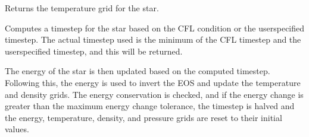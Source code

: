 \documentclass[letterpaper,10pt,english]{sphinxmanual}
\begin{document}
\begin{fulllineitems}
\begin{fulllineitems}
\end{fulllineitems}


\begin{fulllineitems}
\label{\detokenize{CoolDwarf.star:CoolDwarf.star.sphere.VoxelSphere.temperature}}
\pysigstartsignatures
{}
\pysigstopsignatures
\sphinxAtStartPar
Returns the temperature grid for the star.
\begin{quote}\begin{description}
\begin{description}
\end{description}

\end{description}\end{quote}

\end{fulllineitems}


\begin{fulllineitems}
\label{\detokenize{CoolDwarf.star:CoolDwarf.star.sphere.VoxelSphere.timestep}}
\pysigstartsignatures
{}
\pysigstopsignatures
\sphinxAtStartPar
Computes a timestep for the star based on the CFL condition or the user\sphinxhyphen{}specified timestep.
The actual timestep used is the minimum of the CFL timestep and the user\sphinxhyphen{}specified timestep, 
and this will be returned.

\sphinxAtStartPar
The energy of the star is then updated based on the computed timestep. Following this, the energy
is used to invert the EOS and update the temperature and density grids. The energy conservation
is checked, and if the energy change is greater than the maximum energy change tolerance, the timestep
is halved and the energy, temperature, density, and pressure grids are reset to their initial values.


\end{fulllineitems}
\end{fulllineitems}
\end{document}
